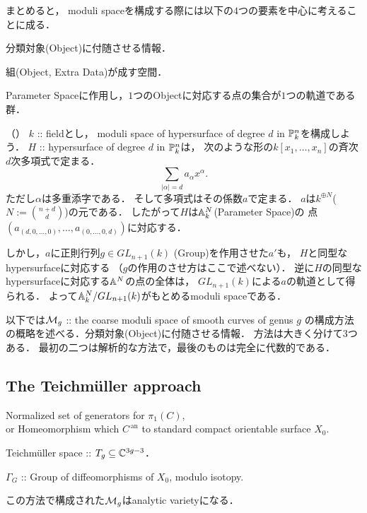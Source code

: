 \documentclass[a4paper]{jsarticle}
\newcommand{\tp}[2]{\texorpdfstring{#1}{#2}}
\newcommand{\an}[1]{{#1}^{\,\mathrm{an}}}
\begin{document}
    まとめると，
    moduli spaceを構成する際には以下の$4$つの要素を中心に考えることに成る．
    \begin{description}[leftmargin=!,labelwidth=\widthof{\bfseries Container Space}]
        \item[Extra Data] 分類対象(Object)に付随させる情報．
        \item[Parameter Space] 組(Object, Extra Data)が成す空間．
        \item[Group] Parameter Spaceに作用し，$1$つのObjectに対応する点の集合が$1$つの軌道である群．
    \end{description}
    
    \begin{Example}（\cite{Muk1}）
        $k$ :: fieldとし，
        moduli space of hypersurface of degree $d$ in $\mathbb{P}_{k}^n$を構成しよう．
        $H$ :: hypersurface of degree $d$ in $\mathbb{P}_{k}^n$は，
        次のような形の$k[x_1,\dots,x_n]$の斉次$d$次多項式で定まる．
        \[ \sum_{|\alpha|=d} a_{\alpha} x^{\alpha}. \]
        ただし$\alpha$は多重添字である．
        そして多項式はその係数$a$で定まる．
        $a$は$k^{\oplus N}$($N:=\binom{n+d}{d}$)の元である．
        したがって$H$は$\mathbb{A}_k^N$(Parameter Space)の
        点$(a_{(d,0,\dots,0)}, \dots, a_{(0,\dots,0,d)})$に対応する．

        しかし，$a$に正則行列$g \in GL_{n+1}(k)$ (Group)を作用させた$a'$も，
        $H$と同型なhypersurfaceに対応する
        （$g$の作用のさせ方はここで述べない）．
        逆に$H$の同型なhypersurfaceに対応する$\mathbb{A}^N$の点の全体は，
        $GL_{n+1}(k)$による$a$の軌道として得られる．
        よって$\mathbb{A}_k^N/GL_{n+1}(k)$がもとめるmoduli spaceである．
    \end{Example}

    以下では$\mathcal{M}_g$ :: the coarse moduli space of smooth curves of genus $g$
    の構成方法の概略を述べる．分類対象(Object)に付随させる情報．
    方法は大きく分けて$3$つある．
    最初の二つは解析的な方法で，最後のものは完全に代数的である．

    \subsection{The Teichm\tp{\"u}{u}ller approach}
    \begin{description}[leftmargin=!,labelwidth=\widthof{\bfseries Parameter Space}]
        \item[Extra Data]
            Normalized set of generators for $\pi_1(C)$, \\
            or Homeomorphism which $\an{C}$ to standard compact orientable surface $X_0$.
        \item[Parameter Space] Teichm\"uller space :: $T_g \subseteq \mathbb{C}^{3g-3}$．
        \item[Group] $\Gamma_G$ :: Group of diffeomorphisms of $X_0$, modulo isotopy.
    \end{description}
    この方法で構成された$\mathcal{M}_g$はanalytic varietyになる．
\end{document}
